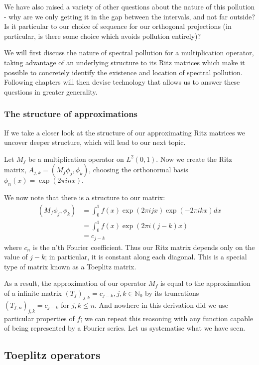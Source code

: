 \documentclass[../main.tex]{subfiles}
\begin{document}
We have also raised a variety of other questions about the nature of this pollution - why are we only getting it in the gap between the intervals, and not far outside? Is it particular to our choice of sequence for our orthogonal projections (in particular, is there some choice which avoids pollution entirely)?

We will first discuss the nature of spectral pollution for a multiplication operator, taking advantage of an underlying structure to its Ritz matrices which 
make it possible to concretely identify the existence and location of spectral pollution. Following chapters will then devise technology that allows us to 
answer these questions in greater generality.

\subsubsection{The structure of approximations}
If we take a closer look at the structure of our approximating Ritz matrices we uncover deeper structure, which will lead
to our next topic.
\begin{example}\label{exp:mult-op-toeplitz}
Let $M_f$ be a multiplication operator on $L^2(0, 1)$. Now we create the Ritz matrix, $A_{j,k} = (M_f \phi_j, \phi_k)$, 
choosing the orthonormal basis $\phi_n(x) = \exp(2 \pi i n x).$

We now note that there is a structure to our matrix:
\begin{align*}
(M_f \phi_j, \phi_k) & = \int_0^1 f(x) \exp(2 \pi i j x) \exp(-2 \pi i k x) dx \\
& = \int_0^1 f(x) \exp(2 \pi i (j-k) x)\\
& = c_{j-k}
\end{align*}
where $c_n$ is the n'th Fourier coefficient. Thus our Ritz matrix depends only on the value of $j-k$; in particular, it is constant
along each diagonal. This is a special type of matrix known as a Toeplitz matrix.
\end{example}
As a result, the approximation of our operator $M_f$ is equal to the approximation of a infinite matrix $(T_f)_{j,k} = c_{j-k},
j,k \in \mathbb{N}_0$ by its truncations $(T_{f,n})_{j,k} = c_{j-k}$ for $j, k \leq n$. And nowhere in this derivation did we use particular
properties of $f$; we can repeat this reasoning with any function capable of being represented by a Fourier series. Let us systematise
what we have seen.

\subsection{Toeplitz operators}
\end{document}
